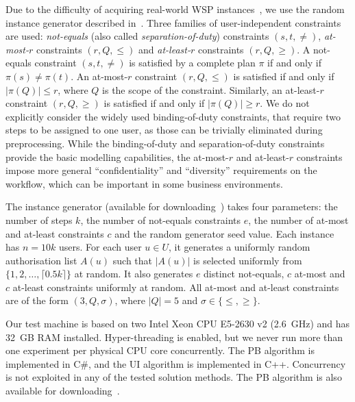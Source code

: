 \documentclass[runningheads,proof]{llncs}
\begin{document}
Due to the difficulty of acquiring real-world WSP instances~\cite{FAW2014,WaLi10}, we use the random instance generator described in~\cite{FAW2014}.
Three families of user-independent constraints are used: \emph{not-equals} (also called \emph{separation-of-duty}) constraints \mbox{$(s, t, \neq)$}, \emph{at-most-$r$} constraints $(r, Q, \leqslant)$ and \emph{at-least-$r$} constraints $(r, Q, \geqslant)$.
A not-equals constraint $(s, t, \neq)$ is satisfied by a complete plan $\pi$ if and only if $\pi(s) \neq \pi(t)$.
An at-most-$r$ constraint $(r, Q, \leqslant)$ is satisfied if and only if $|\pi(Q)| \le r$, where $Q$ is the scope of the constraint.
Similarly, an at-least-$r$ constraint $(r, Q, \geqslant)$ is satisfied if and only if $|\pi(Q)| \ge r$.
We do not explicitly consider the widely used binding-of-duty constraints, that require two steps to be assigned to one user, as those can be trivially eliminated during preprocessing.
While the binding-of-duty and separation-of-duty constraints provide the basic modelling capabilities, the at-most-$r$ and at-least-$r$ constraints impose more general ``confidentiality'' and ``diversity'' requirements on the workflow, which can be important in some business environments.

The instance generator (available for downloading~\cite{SourceCodes}) takes four parameters: the number of steps $k$, the number of not-equals constraints $e$, the number of at-most and at-least constraints $c$ and the random generator seed value.
Each instance has $n = 10k$ users.  
For each user $u \in U$, it generates a uniformly random authorisation list $A(u)$ such that $|A(u)|$ is selected uniformly from $\{ 1, 2, \ldots, \lceil 0.5 k \rceil \}$ at random.  
It also generates $e$ distinct not-equals, $c$ at-most and $c$ at-least constraints uniformly at random.
All at-most and at-least constraints are of the form $(3, Q, \sigma)$, where $|Q| = 5$ and $\sigma \in \{ \leqslant, \geqslant \}$.

Our test machine is based on two Intel Xeon CPU E5-2630 v2 (2.6~GHz) and has 32~GB RAM installed.  
Hyper-threading is enabled, but we never run more than one experiment per physical CPU core concurrently.  
The PB algorithm is implemented in C\#, and the UI algorithm is implemented in C++.  
Concurrency is not exploited in any of the tested solution methods.
The PB algorithm is also available for downloading~\cite{SourceCodes}.

\bigskip
\end{document}

